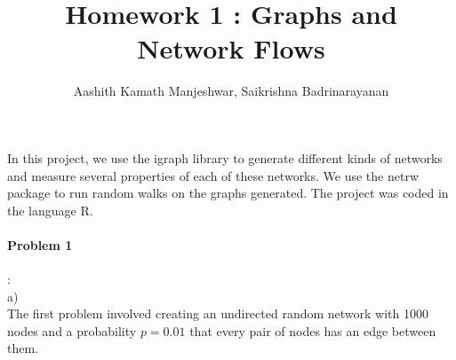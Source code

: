 \documentclass{article}
\title{Homework 1 : Graphs and Network Flows}
\author{Aashith Kamath Manjeshwar, Saikrishna Badrinarayanan}
\begin{document}
\maketitle

In this project, we use the igraph library to generate different kinds of networks and measure several properties of 
each of these networks. We use the netrw package to run random walks on the graphs
generated. The project was coded in the language R.

\paragraph{Problem 1}: \\
a)\\
The first problem involved creating an undirected random network with 1000 nodes and a probability $p=0.01$ that
every pair of nodes has an edge between them. \\
\end{document}
